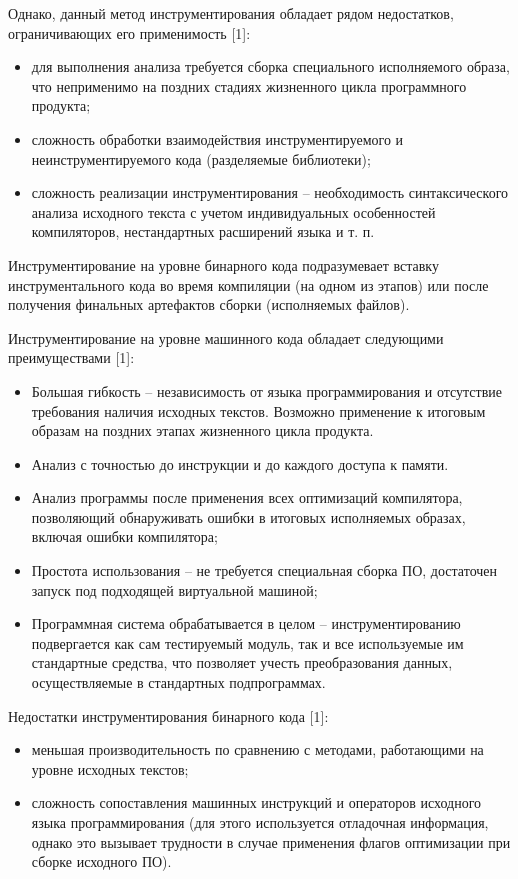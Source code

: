 Однако, данный метод инструментирования обладает рядом недостатков, ограничивающих его применимость [1]:
\begin{itemize}
  \item для выполнения анализа требуется сборка специального исполняемого образа, что неприменимо на поздних стадиях жизненного цикла программного продукта;
  \item сложность обработки взаимодействия инструментируемого и неинструментируемого кода (разделяемые библиотеки);
  \item сложность реализации инструментирования -- необходимость синтаксического анализа исходного текста с учетом индивидуальных особенностей компиляторов, нестандартных расширений языка и т. п.
\end{itemize}

Инструментирование на уровне бинарного кода подразумевает вставку инструментального кода во время компиляции (на одном из этапов) или после получения финальных артефактов сборки (исполняемых файлов).

Инструментирование на уровне машинного кода обладает следующими преимуществами [1]:
\begin{itemize}
  \item Большая гибкость -- независимость от языка программирования и отсутствие требования наличия исходных текстов. Возможно применение к итоговым образам на поздних этапах жизненного цикла продукта.
  \item Анализ с точностью до инструкции и до каждого доступа к памяти.
  \item Анализ программы после применения всех оптимизаций компилятора, позволяющий обнаруживать ошибки в итоговых исполняемых образах, включая ошибки компилятора;
  \item Простота использования -- не требуется специальная сборка ПО, достаточен запуск под подходящей виртуальной машиной;
  \item Программная система обрабатывается в целом -- инструментированию подвергается как сам тестируемый модуль, так и все используемые им стандартные средства, что позволяет учесть преобразования данных, осуществляемые в стандартных подпрограммах.
\end{itemize}

Недостатки инструментирования бинарного кода [1]:
\begin{itemize}
  \item меньшая производительность по сравнению с методами, работающими на уровне исходных текстов;
  \item сложность сопоставления машинных инструкций и операторов исходного языка программирования (для этого используется отладочная информация, однако это вызывает трудности в случае применения флагов оптимизации при сборке исходного ПО).
\end{itemize}

